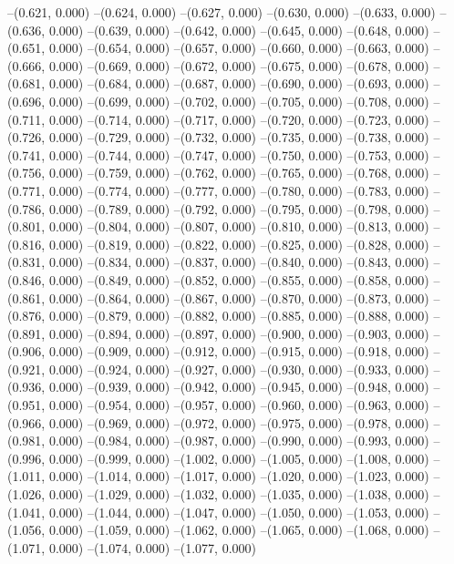 --(0.621, 0.000)
--(0.624, 0.000)
--(0.627, 0.000)
--(0.630, 0.000)
--(0.633, 0.000)
--(0.636, 0.000)
--(0.639, 0.000)
--(0.642, 0.000)
--(0.645, 0.000)
--(0.648, 0.000)
--(0.651, 0.000)
--(0.654, 0.000)
--(0.657, 0.000)
--(0.660, 0.000)
--(0.663, 0.000)
--(0.666, 0.000)
--(0.669, 0.000)
--(0.672, 0.000)
--(0.675, 0.000)
--(0.678, 0.000)
--(0.681, 0.000)
--(0.684, 0.000)
--(0.687, 0.000)
--(0.690, 0.000)
--(0.693, 0.000)
--(0.696, 0.000)
--(0.699, 0.000)
--(0.702, 0.000)
--(0.705, 0.000)
--(0.708, 0.000)
--(0.711, 0.000)
--(0.714, 0.000)
--(0.717, 0.000)
--(0.720, 0.000)
--(0.723, 0.000)
--(0.726, 0.000)
--(0.729, 0.000)
--(0.732, 0.000)
--(0.735, 0.000)
--(0.738, 0.000)
--(0.741, 0.000)
--(0.744, 0.000)
--(0.747, 0.000)
--(0.750, 0.000)
--(0.753, 0.000)
--(0.756, 0.000)
--(0.759, 0.000)
--(0.762, 0.000)
--(0.765, 0.000)
--(0.768, 0.000)
--(0.771, 0.000)
--(0.774, 0.000)
--(0.777, 0.000)
--(0.780, 0.000)
--(0.783, 0.000)
--(0.786, 0.000)
--(0.789, 0.000)
--(0.792, 0.000)
--(0.795, 0.000)
--(0.798, 0.000)
--(0.801, 0.000)
--(0.804, 0.000)
--(0.807, 0.000)
--(0.810, 0.000)
--(0.813, 0.000)
--(0.816, 0.000)
--(0.819, 0.000)
--(0.822, 0.000)
--(0.825, 0.000)
--(0.828, 0.000)
--(0.831, 0.000)
--(0.834, 0.000)
--(0.837, 0.000)
--(0.840, 0.000)
--(0.843, 0.000)
--(0.846, 0.000)
--(0.849, 0.000)
--(0.852, 0.000)
--(0.855, 0.000)
--(0.858, 0.000)
--(0.861, 0.000)
--(0.864, 0.000)
--(0.867, 0.000)
--(0.870, 0.000)
--(0.873, 0.000)
--(0.876, 0.000)
--(0.879, 0.000)
--(0.882, 0.000)
--(0.885, 0.000)
--(0.888, 0.000)
--(0.891, 0.000)
--(0.894, 0.000)
--(0.897, 0.000)
--(0.900, 0.000)
--(0.903, 0.000)
--(0.906, 0.000)
--(0.909, 0.000)
--(0.912, 0.000)
--(0.915, 0.000)
--(0.918, 0.000)
--(0.921, 0.000)
--(0.924, 0.000)
--(0.927, 0.000)
--(0.930, 0.000)
--(0.933, 0.000)
--(0.936, 0.000)
--(0.939, 0.000)
--(0.942, 0.000)
--(0.945, 0.000)
--(0.948, 0.000)
--(0.951, 0.000)
--(0.954, 0.000)
--(0.957, 0.000)
--(0.960, 0.000)
--(0.963, 0.000)
--(0.966, 0.000)
--(0.969, 0.000)
--(0.972, 0.000)
--(0.975, 0.000)
--(0.978, 0.000)
--(0.981, 0.000)
--(0.984, 0.000)
--(0.987, 0.000)
--(0.990, 0.000)
--(0.993, 0.000)
--(0.996, 0.000)
--(0.999, 0.000)
--(1.002, 0.000)
--(1.005, 0.000)
--(1.008, 0.000)
--(1.011, 0.000)
--(1.014, 0.000)
--(1.017, 0.000)
--(1.020, 0.000)
--(1.023, 0.000)
--(1.026, 0.000)
--(1.029, 0.000)
--(1.032, 0.000)
--(1.035, 0.000)
--(1.038, 0.000)
--(1.041, 0.000)
--(1.044, 0.000)
--(1.047, 0.000)
--(1.050, 0.000)
--(1.053, 0.000)
--(1.056, 0.000)
--(1.059, 0.000)
--(1.062, 0.000)
--(1.065, 0.000)
--(1.068, 0.000)
--(1.071, 0.000)
--(1.074, 0.000)
--(1.077, 0.000)
